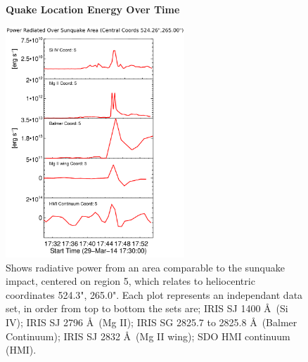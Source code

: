 \begin{figure}[H]
  \begin{center}
  \textbf{Quake Location Energy Over Time}\par\medskip
  \includegraphics[width=0.6\textwidth]{29-Mar-14-Ribbon-Area-5-Sunquake-Area-Power-Ladder}
  \end{center}
  \caption{Shows radiative power from an area comparable to the sunquake impact, centered on region 5, which relates to heliocentric coordinates 524.3", 265.0". Each plot represents an independant data set, in order from top to bottom the sets are; IRIS SJ 1400 \AA\ (Si IV); IRIS SJ 2796 \AA\ (Mg II); IRIS SG  2825.7 to 2825.8 \AA\ (Balmer Continuum); IRIS SJ 2832 \AA\ (Mg II wing); SDO HMI continuum (HMI).}\label{plot5}
\end{figure}

